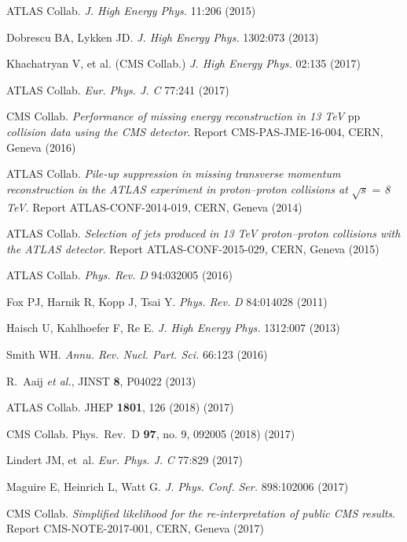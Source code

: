 \documentclass{ar-1col}
\begin{document}
\begin{thebibliography}{175}
{ATLAS Collab.} \textit{J. High Energy Phys.} 11:206 (2015)

Dobrescu BA, Lykken JD. \textit{J. High Energy Phys.} 1302:073 (2013)

{Khachatryan V, et al. (CMS Collab}.) \textit{J. High Energy Phys.} 02:135 (2017)

{ATLAS Collab.} \textit{Eur. Phys. J.} \textit{C} 77:241 (2017)

{CMS Collab}. \textit{Performance of missing energy reconstruction in 13 TeV }pp \textit{collision data using the CMS detector}.
Report CMS-PAS-JME-16-004, CERN, Geneva (2016)

ATLAS Collab. \textit{Pile-up suppression in missing transverse momentum reconstruction in the ATLAS experiment in proton--proton collisions at} $\sqrt{s}$ = \textit{8 TeV}. Report ATLAS-CONF-2014-019, CERN, Geneva (2014)

ATLAS Collab. \textit{Selection of jets produced in 13 TeV proton--proton collisions with the ATLAS detector}.
Report ATLAS-CONF-2015-029, CERN, Geneva (2015)

{ATLAS Collab.} \textit{Phys. Rev.} \textit{D} 94:032005 (2016)

Fox PJ, Harnik R, Kopp J, Tsai Y. \textit{Phys. Rev.} \textit{D} 84:014028
(2011)

Haisch U, Kahlhoefer F, Re E. \textit{J. High Energy Phys.} 1312:007 (2013)

Smith WH. \textit{Annu. Rev. Nucl. Part. Sci.} 66:123 (2016)

R.~Aaij {\it et al.}, JINST {\bf 8}, P04022 (2013)
  
{ATLAS Collab.} JHEP {\bf 1801}, 126 (2018) (2017)

{CMS Collab.} Phys.\ Rev.\ D {\bf 97}, no. 9, 092005 (2018) (2017)

Lindert JM, et~al. \textit{Eur. Phys. J.} \textit{C} 77:829 (2017)

Maguire E, Heinrich L, Watt G. \textit{J. Phys. Conf. Ser.}
898:102006 (2017)

CMS Collab. \textit{Simplified likelihood for the re-interpretation of public CMS results}. Report CMS-NOTE-2017-001, CERN, Geneva (2017)


\end{thebibliography}
\end{document}

